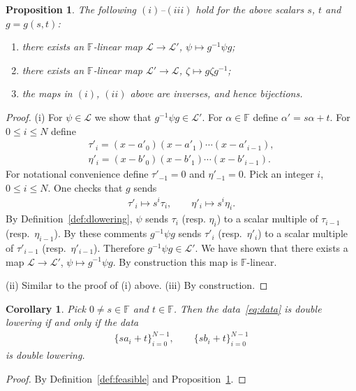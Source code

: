 \documentclass[pdftex]{sigma}
\numberwithin{equation}{section}
\newtheorem{Corollary}[Theorem]{Corollary}
\newtheorem{Proposition}[Theorem]{Proposition}
\begin{document}
\begin{Proposition}\label{prop:LLp}
The following $(i)$--$(iii)$ hold for the above scalars $s$, $t$ and $g=g(s,t)$:
\begin{enumerate}\itemsep=0pt
\item[$(i)$]
there exists an $\mathbb F$-linear map
$\mathcal L \to \mathcal L'$,
 $\psi \mapsto g^{-1} \psi g$;
\item[$(ii)$]
there exists an $\mathbb F$-linear map
$\mathcal L' \to \mathcal L$,
$\zeta \mapsto g \zeta g^{-1}$;
\item[$(iii)$] the maps in $(i)$, $(ii)$ above are inverses,
and hence bijections.
\end{enumerate}
\end{Proposition}
\begin{proof} (i) For $\psi \in \mathcal L$ we show that
$g^{-1}\psi g \in \mathcal L'$.
For $\alpha \in \mathbb F$
define $\alpha' = s \alpha + t$. For $0 \leq i \leq N$
define
\begin{gather*}
\tau'_i = (x - a'_0)(x-a'_1)\cdots (x - a'_{i-1}),\\
\eta'_i = (x - b'_0)(x-b'_1)\cdots (x - b'_{i-1}).
\end{gather*}
For notational convenience define $\tau'_{-1}=0$ and
$\eta'_{-1}=0$.
Pick an integer $i$, $0 \leq i \leq N$.
One checks that $g$ sends
\begin{gather*}
\tau'_i \mapsto s^i \tau_i, \qquad
\eta'_i \mapsto s^i \eta_i.
\end{gather*}
By Definition~\ref{def:dlowering}, $\psi$ sends
$\tau_i$ (resp. $\eta_i$) to a scalar multiple of
$\tau_{i-1}$ (resp.~$\eta_{i-1}$).
By these comments $g^{-1} \psi g$ sends
$\tau'_i$ (resp.~$\eta'_i$) to a scalar multiple of
$\tau'_{i-1}$ (resp.~$\eta'_{i-1}$).
Therefore \mbox{$g^{-1} \psi g \in \mathcal L'$}.
We have shown that there exists a map
 $\mathcal L \to \mathcal L'$,
$\psi \mapsto g^{-1} \psi g$.
By construction this map is $\mathbb F$-linear.

(ii) Similar to the proof of (i) above. (iii) By construction.
\end{proof}

\begin{Corollary}\label{cor:affine}
Pick $0 \not=s \in \mathbb F$ and
$t \in \mathbb F$. Then the data~\eqref{eq:data} is double lowering if and only if
the data
\begin{gather*}
\lbrace sa_i + t\rbrace_{i=0}^{N-1}, \qquad
\lbrace sb_i + t\rbrace_{i=0}^{N-1}
\end{gather*}
is double lowering.
\end{Corollary}
\begin{proof} By Definition~\ref{def:feasible}
and Proposition~\ref{prop:LLp}.
\end{proof}
\end{document}
